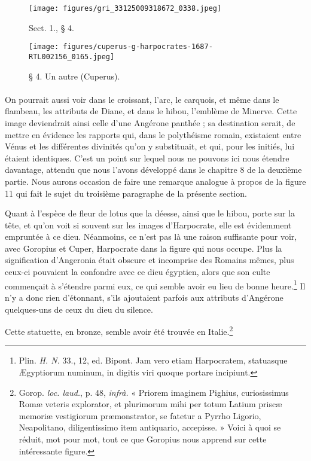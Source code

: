 \documentclass[a4paper, 11pt, oneside, polutonikogreek, french]{article}
\begin{document}
\clearpage
\vspace*{\fill}
\begin{figure}[H]
\centering
\texttt{[image: figures/gri\_33125009318672\_0338.jpeg]}
\caption{Sect. 1., § 4.}
\end{figure}
\vspace*{\fill}
\clearpage
\vspace*{\fill}
\begin{figure}[H]
\centering
\texttt{[image: figures/cuperus-g-harpocrates-1687-RTL002156\_0165.jpeg]}
\caption{§ 4. Un autre (Cuperus).}
\end{figure}
\vspace*{\fill}
\clearpage
\paragraph{}
On pourrait aussi voir dans le croissant, l'arc, le carquois, et même dans le flambeau, les attributs de Diane, et dans le hibou, l'emblème de Minerve. Cette image deviendrait ainsi celle d'une Angérone panthée ; sa destination serait, de mettre en évidence les rapports qui, dans le polythéisme romain, existaient entre Vénus et les différentes divinités qu'on y substituait, et qui, pour les initiés, lui étaient identiques. C'est un point sur lequel nous ne pouvons ici nous étendre davantage, attendu que nous l'avons développé dans le chapitre 8 de la deuxième partie. Nous aurons occasion de faire une remarque analogue à propos de la figure 11 qui fait le sujet du troisième paragraphe de la présente section.

Quant à l'espèce de fleur de lotus que la déesse, ainsi que le hibou, porte sur la tête, et qu'on voit si souvent sur les images d'Harpocrate, elle est évidemment empruntée à ce dieu. Néanmoins, ce n'est pas là une raison suffisante pour voir, avec Goropius et Cuper, Harpocrate dans la figure qui nous occupe. Plus la signification d'Angeronia était obscure et incomprise des Romains mêmes, plus ceux-ci pouvaient la confondre avec ce dieu égyptien, alors que son culte commençait à s'étendre parmi eux, ce qui semble avoir eu lieu de bonne heure.\footnote{Plin. \emph{H. N.} 33., 12, ed. Bipont. Jam vero etiam Harpocratem, statuasque Ægyptiorum numinum, in digitis viri quoque portare incipiunt.} Il n'y a donc rien d'étonnant, s'ils ajoutaient parfois aux attributs d'Angérone quelques-uns de ceux du dieu du silence.

Cette statuette, en bronze, semble avoir été trouvée en Italie.\footnote{Gorop. \emph{loc. laud.}, p. 48, \emph{infrà.} « Priorem imaginem Pighius, curiosissimus Romæ veteris explorator, et plurimorum mihi per totum Latium priscæ memoriæ vestigiorum præmonstrator, se fatetur a Pyrrho Ligorio, Neapolitano, diligentissimo item antiquario, accepisse. » Voici à quoi se réduit, mot pour mot, tout ce que Goropius nous apprend sur cette intéressante figure.}
\end{document}
